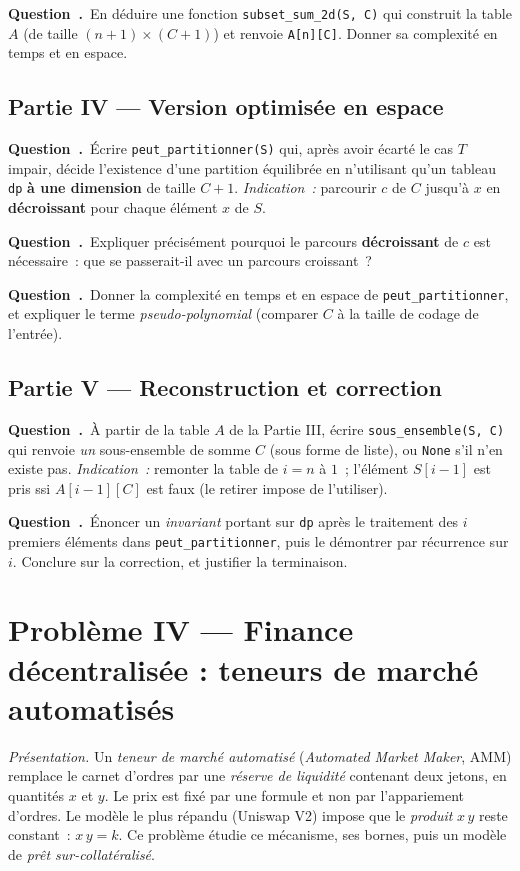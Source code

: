 \documentclass[11pt,a4paper]{article}
\newcounter{qcnt}
\newcommand{\Q}{\medskip\par\stepcounter{qcnt}\noindent\textbf{Question~\theqcnt.}~}
\newcommand{\code}[1]{\lstinline!#1!}
\begin{document}
\Q En déduire une fonction \code{subset_sum_2d(S, C)} qui construit la table $A$ (de taille
$(n+1)\times(C+1)$) et renvoie \code{A[n][C]}. Donner sa complexité en temps et en espace.

\subsection*{Partie IV --- Version optimisée en espace}

\Q Écrire \code{peut_partitionner(S)} qui, après avoir écarté le cas $T$ impair, décide
l'existence d'une partition équilibrée en n'utilisant qu'un tableau \code{dp} \textbf{à une
dimension} de taille $C+1$. \emph{Indication~:} parcourir $c$ de $C$ jusqu'à $x$ en
\textbf{décroissant} pour chaque élément $x$ de $S$.

\Q Expliquer précisément pourquoi le parcours \textbf{décroissant} de $c$ est nécessaire~: que se
passerait-il avec un parcours croissant~?

\Q Donner la complexité en temps et en espace de \code{peut_partitionner}, et expliquer le terme
\emph{pseudo-polynomial} (comparer $C$ à la taille de codage de l'entrée).

\subsection*{Partie V --- Reconstruction et correction}

\Q À partir de la table $A$ de la Partie III, écrire \code{sous_ensemble(S, C)} qui renvoie
\emph{un} sous-ensemble de somme $C$ (sous forme de liste), ou \code{None} s'il n'en existe pas.
\emph{Indication~:} remonter la table de $i=n$ à $1$~; l'élément $S[i-1]$ est pris ssi
$A[i-1][C]$ est faux (le retirer impose de l'utiliser).

\Q Énoncer un \emph{invariant} portant sur \code{dp} après le traitement des $i$ premiers éléments
dans \code{peut_partitionner}, puis le démontrer par récurrence sur $i$. Conclure sur la
correction, et justifier la terminaison.

\clearpage
\section*{Problème IV --- Finance décentralisée : teneurs de marché automatisés}
\noindent\emph{Présentation.} Un \emph{teneur de marché automatisé} (\emph{Automated Market Maker}, AMM) remplace le carnet
d'ordres par une \emph{réserve de liquidité} contenant deux jetons, en quantités $x$ et $y$. Le
prix est fixé par une formule et non par l'appariement d'ordres. Le modèle le plus répandu
(Uniswap V2) impose que le \emph{produit} $x\,y$ reste constant~: $x\,y = k$. Ce problème étudie
ce mécanisme, ses bornes, puis un modèle de \emph{prêt sur-collatéralisé}.
\end{document}

